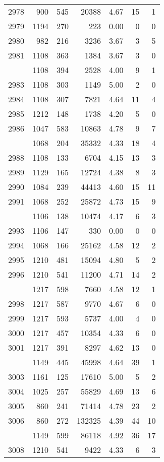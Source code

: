\documentclass[
]{article}
\begin{document}
\begin{table}
\begin{tabular}[t]{lrrrrrr}
2978 & 900 & 545 & 20388 & 4.67 & 15 & 1\\
2979 & 1194 & 270 & 223 & 0.00 & 0 & 0\\
2980 & 982 & 216 & 3236 & 3.67 & 3 & 5\\
2981 & 1108 & 363 & 1384 & 3.67 & 3 & 0\\
\addlinespace
2982 & 1108 & 394 & 2528 & 4.00 & 9 & 1\\
2983 & 1108 & 303 & 1149 & 5.00 & 2 & 0\\
2984 & 1108 & 307 & 7821 & 4.64 & 11 & 4\\
2985 & 1212 & 148 & 1738 & 4.20 & 5 & 0\\
2986 & 1047 & 583 & 10863 & 4.78 & 9 & 7\\
\addlinespace
2987 & 1068 & 204 & 35332 & 4.33 & 18 & 4\\
2988 & 1108 & 133 & 6704 & 4.15 & 13 & 3\\
2989 & 1129 & 165 & 12724 & 4.38 & 8 & 3\\
2990 & 1084 & 239 & 44413 & 4.60 & 15 & 11\\
2991 & 1068 & 252 & 25872 & 4.73 & 15 & 9\\
\addlinespace
2992 & 1106 & 138 & 10474 & 4.17 & 6 & 3\\
2993 & 1106 & 147 & 330 & 0.00 & 0 & 0\\
2994 & 1068 & 166 & 25162 & 4.58 & 12 & 2\\
2995 & 1210 & 481 & 15094 & 4.80 & 5 & 2\\
2996 & 1210 & 541 & 11200 & 4.71 & 14 & 2\\
\addlinespace
2997 & 1217 & 598 & 7660 & 4.58 & 12 & 1\\
2998 & 1217 & 587 & 9770 & 4.67 & 6 & 0\\
2999 & 1217 & 593 & 5737 & 4.00 & 4 & 0\\
3000 & 1217 & 457 & 10354 & 4.33 & 6 & 0\\
3001 & 1217 & 391 & 8297 & 4.62 & 13 & 0\\
\addlinespace
3002 & 1149 & 445 & 45998 & 4.64 & 39 & 1\\
3003 & 1161 & 125 & 17610 & 5.00 & 5 & 2\\
3004 & 1025 & 257 & 55829 & 4.69 & 13 & 6\\
3005 & 860 & 241 & 71414 & 4.78 & 23 & 2\\
3006 & 860 & 272 & 132325 & 4.39 & 44 & 10\\
\addlinespace
3007 & 1149 & 599 & 86118 & 4.92 & 36 & 17\\
3008 & 1210 & 541 & 9422 & 4.33 & 6 & 3\\

\end{tabular}
\end{table}
\end{document}
